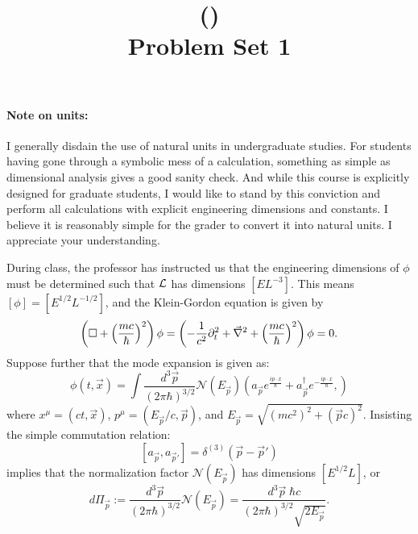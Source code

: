 \documentclass[11pt]{article}
\title{\coursename (\coursecode)\\Problem Set 1}
\author{\studentname}
\date{\semester}
\begin{document}
\maketitle

\paragraph{Note on units:}
I generally disdain the use of natural units in undergraduate studies.
For students having gone through a symbolic mess of a calculation,
something as simple as dimensional analysis gives a good sanity check.
And while this course is explicitly designed for graduate students,
I would like to stand by this conviction and perform all calculations
with explicit engineering dimensions and constants.
I believe it is reasonably simple for the grader to convert it into natural units.
I appreciate your understanding.

During class, the professor has instructed us that the engineering dimensions of $\phi$
must be determined such that $\mathcal{L}$ has dimensions $[E L^{-3}]$.
This means $[\phi] = [E^{1/2} L^{-1/2}]$, and the Klein-Gordon equation is given by
\[
    \left(\square + \left(\frac{mc}{\hbar}\right)^2\right)\phi
    = \left(
        -\frac{1}{c^2}\partial_t^2
        + \vec{\nabla}^2
        + \left(\frac{mc}{\hbar}\right)^2
    \right) \phi
    = 0.
\]
Suppose further that the mode expansion is given as:
\[
    \phi(t,\vec{x}) = \int\frac{d^3\vec{p}}{(2\pi\hbar)^{3/2}} \mathcal{N}(E_{\vec{p}})
    \left(
        a_{\vec{p}} e^{\frac{ip\cdot x}{\hbar}}
        + a_{\vec{p}}^\dagger e^{-\frac{ip\cdot x}{\hbar}},
    \right)
\]
where $x^\mu = (ct, \vec{x})$, $p^\mu = (E_{\vec{p}}/c, \vec{p})$, and
$E_{\vec{p}} = \sqrt{(mc^2)^2 + (\vec{p}c)^2}$.
Insisting the simple commutation relation:
\[
    \left[a_{\vec{p}}, a_{\vec{p}'}\right] = \delta^{(3)}(\vec{p}-\vec{p}')
\]
implies that the normalization factor $\mathcal{N}(E_{\vec{p}})$ has dimensions $[E^{1/2} L]$, or
\[
    d\Pi_{\vec{p}}
    := \frac{d^3\vec{p}}{(2\pi\hbar)^{3/2}} \mathcal{N}(E_{\vec{p}})
    = \frac{d^3\vec{p}\; \hbar c}{(2\pi\hbar)^{3/2}\sqrt{2E_{\vec{p}}}}.
\]
\end{document}
